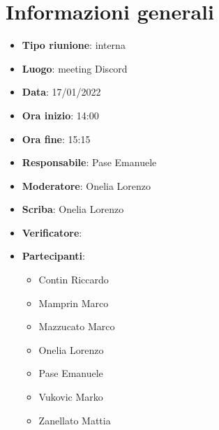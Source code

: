 \section{Informazioni generali}
\begin{itemize}
  \item \textbf{Tipo riunione}: interna
  \item \textbf{Luogo}: meeting Discord
  \item \textbf{Data}: 17/01/2022
  \item \textbf{Ora inizio}: 14:00
  \item \textbf{Ora fine}: 15:15
  \item \textbf{Responsabile}: Pase Emanuele
  \item \textbf{Moderatore}: Onelia Lorenzo
  \item \textbf{Scriba}: Onelia Lorenzo
  \item \textbf{Verificatore}: 
  \item \textbf{Partecipanti}:
  \begin{itemize}
    \item Contin Riccardo
    \item Mamprin Marco
    \item Mazzucato Marco
    \item Onelia Lorenzo
    \item Pase Emanuele
    \item Vukovic Marko
    \item Zanellato Mattia
  \end{itemize}
\end{itemize}

